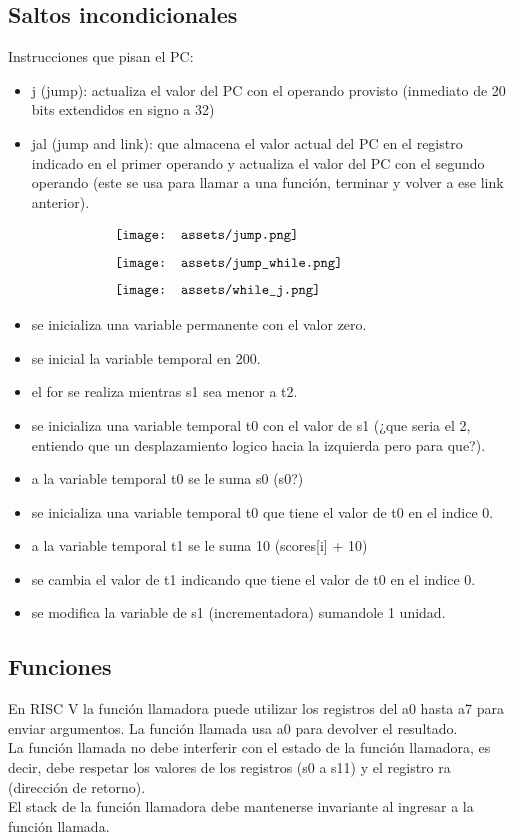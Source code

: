 \documentclass[10pt,a4paper]{article}
\begin{document}
\subsection*{Saltos incondicionales}
Instrucciones que pisan el PC: 
\begin{itemize}
    \item j (jump): actualiza el valor del PC con el operando provisto (inmediato de 20 bits extendidos en signo a 32)
    \item jal (jump and link): que almacena el valor actual del PC en el registro indicado en el primer operando y actualiza el valor del PC con el segundo operando (este se usa para llamar a una función, terminar y volver a ese link anterior).
\end{itemize}
\[\begin{minipage}[b]{0.6\textwidth}
    \texttt{[image: assets/jump.png]}
    \label{fig:jump}
\end{minipage}\] 
\[\begin{minipage}[b]{0.6\textwidth}
    \texttt{[image: assets/jump\_while.png]}
    \label{fig:jump_while}
\end{minipage}\] 
\[\begin{minipage}[b]{0.6\textwidth}
    \texttt{[image: assets/while\_j.png]}
    \label{fig:while_j}
\end{minipage}\] 
\begin{itemize}
    \item se inicializa una variable permanente con el valor zero.
    \item se inicial la variable temporal en 200.
    \item el for se realiza mientras s1 sea menor a t2.
    \item se inicializa una variable temporal t0 con el valor de s1 (¿que seria el 2, entiendo que un desplazamiento logico hacia la izquierda pero para que?).
    \item a la variable temporal t0 se le suma s0 (s0?)
    \item se inicializa una variable temporal t0 que tiene el valor de t0 en el indice 0.
    \item a la variable temporal t1 se le suma 10 (scores[i] + 10)
    \item se cambia el valor de t1 indicando que tiene el valor de t0 en el indice 0.
    \item se modifica la variable de s1 (incrementadora) sumandole 1 unidad.
\end{itemize}
\subsection*{Funciones}
En RISC V la función llamadora puede utilizar los registros del a0 hasta a7 para enviar argumentos. La función llamada usa a0 para devolver el resultado. \\
La función llamada no debe interferir con el estado de la función llamadora, es decir, debe respetar los valores de los registros (s0 a s11) y el registro ra (dirección de retorno). \\
El stack de la función llamadora debe mantenerse invariante al ingresar a la función llamada.
\end{document}
